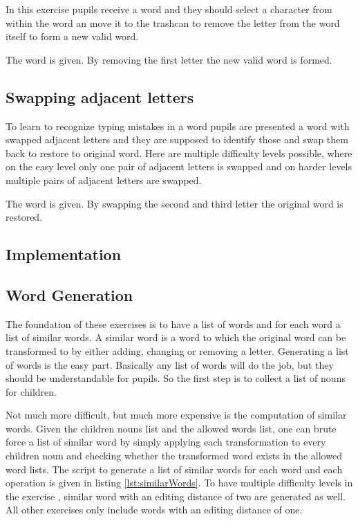 In this exercise pupils receive a word and they should select a character from within the word an move it to the trashcan to remove the letter from the word itself to form a new valid word.

\begin{example}
    The word  is given. By removing the first letter the new valid word  is formed.
\end{example}

\subsection*{Swapping adjacent letters}
\label{subsection:swappingLetters}

To learn to recognize typing mistakes in a word pupils are presented a word with swapped adjacent letters and they are supposed to identify those and swap them back to restore to original word. Here are multiple difficulty levels possible, where on the easy level only one pair of adjacent letters is swapped and on harder levels multiple pairs of adjacent letters are swapped.

\begin{example}
    The word  is given. By swapping the second and third letter the original word  is restored.
\end{example}

\subsection{Implementation}

\subsection*{Word Generation}

The foundation of these exercises is to have a list of words and for each word a list of similar words. A similar word is a word to which the original word can be transformed to by either adding, changing or removing a letter. Generating a list of words is the easy part. Basically any list of words will do the job, but they should be understandable for pupils. So the first step is to collect a list of nouns for children. 

Not much more difficult, but much more expensive is the computation of similar words. Given the children nouns list and the allowed words list, one can brute force a list of similar word by simply applying each transformation to every children noun and checking whether the transformed word exists in the allowed word lists. The script to generate a list of similar words for each word and each operation is given in listing \ref{lst:similarWords}. To have multiple difficulty levels in the exercise , similar word with an editing distance of two are generated as well. All other exercises only include words with an editing distance of one.

